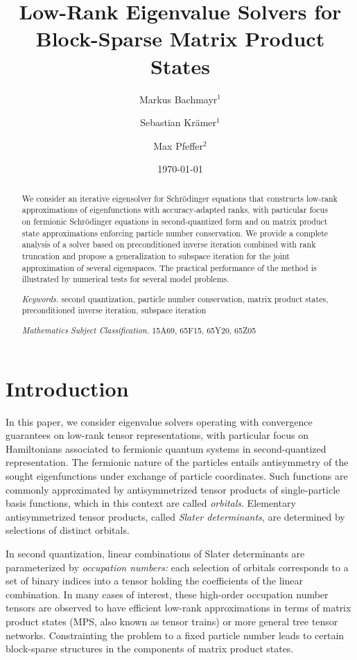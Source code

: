 \documentclass[a4paper,11pt,oneside]{amsart}
\title[Low-Rank Eigenvalue Solvers for Block-Sparse Matrix Product States]{Low-Rank Eigenvalue Solvers for Block-Sparse Matrix Product States}
\author{Markus Bachmayr$^1$}
\author{Sebastian Kr\"amer$^1$}
\author{Max Pfeffer$^2$}
\date{\today}
\theoremstyle{definition}
\theoremstyle{remark}
\numberwithin{equation}{section}
\numberwithin{theorem}{section}
\begin{document}
\maketitle

\vspace{-18pt}
\begin{abstract}
We consider an iterative eigensolver for Schr\"odinger equations that constructs low-rank approximations of eigenfunctions with accuracy-adapted ranks, with particular focus on fermionic Schr\"odinger equations in second-quantized form and on matrix product state approximations enforcing particle number conservation.
We provide a complete analysis of a solver based on preconditioned inverse iteration combined with rank truncation and propose a generalization to subspace iteration for the joint approximation of several eigenspaces.
The practical performance of the method is illustrated by numerical tests for several model problems.
 
 \smallskip
\noindent \emph{Keywords.} second quantization, particle number conservation, matrix product states, preconditioned inverse iteration, subspace iteration

\smallskip
\noindent \emph{Mathematics Subject Classification.} {15A69, 65F15, 65Y20, 65Z05}
\end{abstract}

\section{Introduction}

In this paper, we consider eigenvalue solvers operating with convergence guarantees  on low-rank tensor representations, with particular focus on Hamiltonians associated to fermionic quantum systems in second-quantized representation. 
The fermionic nature of the particles entails antisymmetry of the sought eigenfunctions under exchange of particle coordinates. Such functions are commonly approximated by antisymmetrized tensor products of single-particle basis functions, which in this context are called \emph{orbitals}.
Elementary antisymmetrized tensor products, called \emph{Slater determinants}, are determined by selections of distinct orbitals. 

In second quantization, linear combinations of Slater determinants are parameterized by \emph{occupation numbers:} each selection of orbitals corresponds to a set of binary indices into a tensor holding the coefficients of the linear combination.
In many cases of interest, these high-order occupation number tensors are observed to have efficient low-rank approximations in terms of matrix product states (MPS, also known as tensor trains) or more general tree tensor networks. 
Constrainting the problem to a fixed particle number leads to certain block-sparse structures in the components of matrix product states.
 
\end{document}
